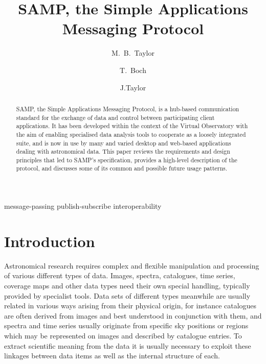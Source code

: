 \documentclass[5p]{elsarticle}
\begin{document}
\begin{frontmatter}

\title{SAMP, the Simple Applications Messaging Protocol}

\author[bristol]{M.~B.~Taylor}
\author[cds]{T.~Boch}
\author[google]{J.Taylor}

\address[bristol]{H.~H.~Wills Physics Laboratory, University of Bristol, UK}
\address[cds]{CDS, Observatoire Astronomique de Strasbourg, France}
\address[google]{Google, USA}

\begin{abstract}
SAMP, the Simple Applications Messaging Protocol, is a
hub-based communication standard for the exchange of data and control
between participating client applications.
It has been developed within the context of the Virtual Observatory
with the aim of enabling specialised data analysis tools to cooperate
as a loosely integrated suite, and is now in use by many and varied
desktop and web-based applications dealing with astronomical data.
This paper reviews the requirements and design principles that led to
SAMP's specification, provides a high-level description of the protocol,
and discusses some of its common and possible future usage patterns.
\end{abstract}

\begin{keyword}
message-passing
publish-subscribe
interoperability
\end{keyword}

\end{frontmatter}

\section{Introduction}


Astronomical research requires complex and flexible manipulation
and processing of various different types of data.
Images, spectra, catalogues, time series, coverage maps and other data
types need their own special handling,
typically provided by specialist tools.
Data sets of different types meanwhile are usually related
in various ways arising from their physical origin,
for instance
catalogues are often derived from images and best understood in
conjunction with them, and
spectra and time series usually originate from specific sky positions
or regions which may be represented on images and described by
catalogue entries.
To extract scientific meaning from the data it is usually necessary
to exploit these linkages between data items as well as the
internal structure of each.
\end{document}
